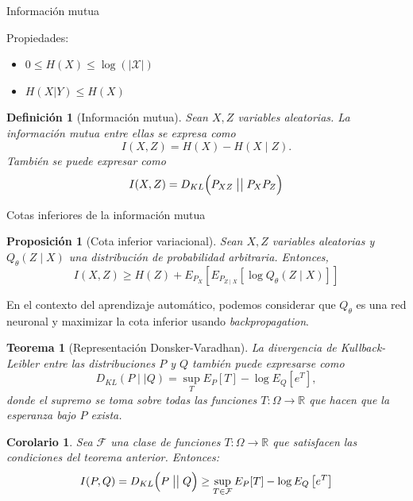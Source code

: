 \documentclass[aspectratio=169]{beamer}
\newcommand\KL[2]{D_{KL}\Big(#1 \bigm|\bigm| #2\Big)}
\newcommand{\X}{\mathcal{X}}
\newcommand{\R}{\mathbb{R}}
\newtheorem{defi}{Definición}
\newtheorem{prop}{Proposición}
\newtheorem{nth}{Teorema}
\newtheorem{cor}{Corolario}
\begin{document}
  \begin{frame}{Información mutua}
    
    \begin{shaded}
    Propiedades:
    \begin{itemize}
      \item $0 \leq H(X) \leq \log(|\X|)$
      \item $ H(X|Y) \leq H(X) $
     \end{itemize}
    \end{shaded}

    \pause
     
    \begin{defi}[Información mutua]
      Sean \(X,Z\) variables aleatorias. La \emph{información mutua} entre ellas se expresa como
      \[
      I(X,Z) = H(X) - H(X\mid Z).
      \]
      También se puede expresar como
      \[
      I(X,Z) =  \KL{P_{XZ}}{P_X P_Z}
      \]
    \end{defi}
 
  \end{frame}
  \begin{frame}{Cotas inferiores de la información mutua}
  \begin{prop}[Cota inferior variacional]
  Sean \(X,Z\) variables aleatorias y \(Q_\theta (Z\mid X)\) una distribución de probabilidad arbitraria. Entonces,
  \[
  I(X,Z) \geq H(Z) + E_{P_X} \left[ E_{P_{Z \mid X}} \left[ \log Q_\theta(Z \mid X) \right]\right]
  \]
  \end{prop}


  En el contexto del aprendizaje automático, podemos considerar que \(Q_\theta\) es una red neuronal y maximizar la cota inferior usando \emph{backpropagation}.
  

\end{frame}

\begin{frame}
  
  
  \begin{nth}[Representación Donsker-Varadhan]
  La divergencia de Kullback-Leibler entre las distribuciones \(P\) y \(Q\) también puede expresarse como
  \[
  D_{KL}(P \mid \mid Q) = \sup_{T} E_P[T] - \log E_Q\left[e^T\right],
  \]
  donde el supremo se toma sobre todas las funciones \(T: \Omega \to \R \) que hacen que la esperanza bajo \( P \) exista.
  \end{nth}
  \pause
  \begin{cor}
  Sea \(\mathcal F\) una clase de funciones \( T : \Omega \to \R \) que satisfacen las condiciones del teorema anterior. Entonces:
  \[
  I(P,Q) = \KL{P}{Q}  \geq \sup_{T \in \mathcal F} E_P[T] - \log E_Q\left[e^T\right]
  \]
  \end{cor}
  \end{frame}
\end{document}
